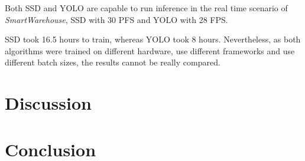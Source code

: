 \documentclass[a4paper, 10pt, journal]{wissarbIEEE}      %
\begin{document}
Both SSD and YOLO are capable to run inference in the real time scenario of \textit{SmartWarehouse}, SSD with 30 PFS and YOLO with 28 FPS. 

SSD took 16.5 hours to train, whereas YOLO took 8 hours. Nevertheless, as both algorithms were trained on different hardware, use different frameworks and use different batch sizes, the results cannot be really compared. 

\section{Discussion} \label{results}

\section{Conclusion} \label{conclusion}


\end{document}
